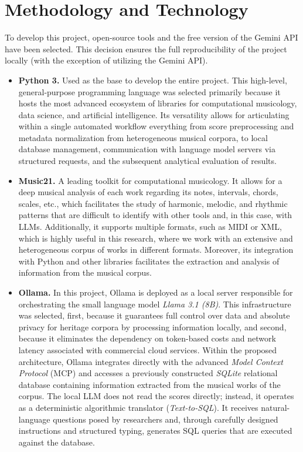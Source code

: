 \section{Methodology and Technology}
To develop this project, open-source tools and the free version of the Gemini API have been selected. This decision ensures the full reproducibility of the project locally (with the exception of utilizing the Gemini API).
\begin{itemize}
\item \textbf{Python 3.} Used as the base to develop the entire project. This high-level, general-purpose programming language was selected primarily because it hosts the most advanced ecosystem of libraries for computational musicology, data science, and artificial intelligence. Its versatility allows for articulating within a single automated workflow everything from score preprocessing and metadata normalization from heterogeneous musical corpora, to local database management, communication with language model servers via structured requests, and the subsequent analytical evaluation of results.

\item \textbf{Music21.} A leading toolkit for computational musicology. It allows for a deep musical analysis of each work regarding its notes, intervals, chords, scales, etc., which facilitates the study of harmonic, melodic, and rhythmic patterns that are difficult to identify with other tools and, in this case, with LLMs. Additionally, it supports multiple formats, such as MIDI or XML, which is highly useful in this research, where we work with an extensive and heterogeneous corpus of works in different formats. Moreover, its integration with Python and other libraries facilitates the extraction and analysis of information from the musical corpus.

\item \textbf{Ollama.} In this project, Ollama is deployed as a local server responsible for orchestrating the small language model \textit{Llama 3.1 (8B)}. This infrastructure was selected, first, because it guarantees full control over data and absolute privacy for heritage corpora by processing information locally, and second, because it eliminates the dependency on token-based costs and network latency associated with commercial cloud services. Within the proposed architecture, Ollama integrates directly with the advanced \textit{Model Context Protocol} (MCP) and accesses a previously constructed \textit{SQLite} relational database containing information extracted from the musical works of the corpus. The local LLM does not read the scores directly; instead, it operates as a deterministic algorithmic translator (\textit{Text-to-SQL}). It receives natural-language questions posed by researchers and, through carefully designed instructions and structured typing, generates SQL queries that are executed against the database.


\end{itemize}
